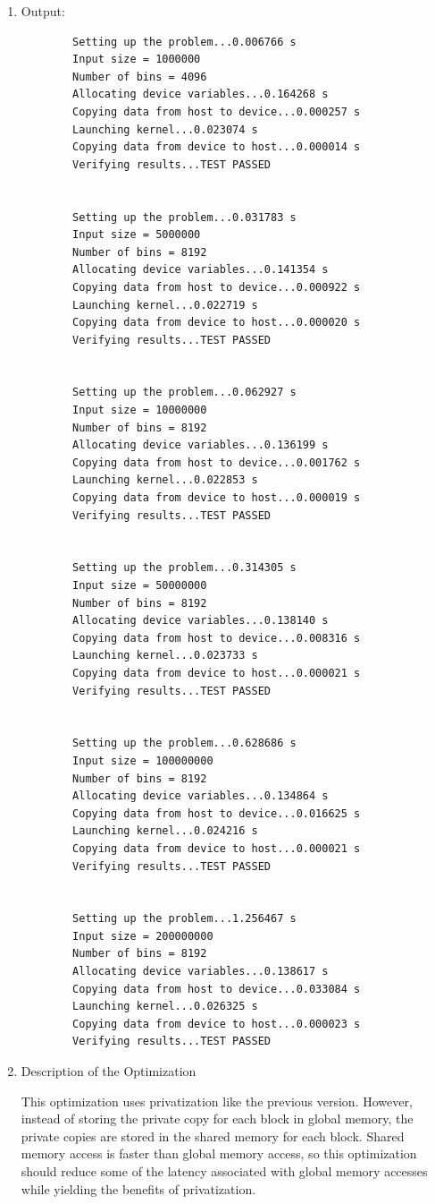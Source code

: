 \documentclass{article}
\begin{document}
\begin{enumerate}
	\item Output:
	\begin{verbatim}
		Setting up the problem...0.006766 s
		Input size = 1000000
		Number of bins = 4096
		Allocating device variables...0.164268 s
		Copying data from host to device...0.000257 s
		Launching kernel...0.023074 s
		Copying data from device to host...0.000014 s
		Verifying results...TEST PASSED
		
		
		Setting up the problem...0.031783 s
		Input size = 5000000
		Number of bins = 8192
		Allocating device variables...0.141354 s
		Copying data from host to device...0.000922 s
		Launching kernel...0.022719 s
		Copying data from device to host...0.000020 s
		Verifying results...TEST PASSED
		
		
		Setting up the problem...0.062927 s
		Input size = 10000000
		Number of bins = 8192
		Allocating device variables...0.136199 s
		Copying data from host to device...0.001762 s
		Launching kernel...0.022853 s
		Copying data from device to host...0.000019 s
		Verifying results...TEST PASSED
		
		
		Setting up the problem...0.314305 s
		Input size = 50000000
		Number of bins = 8192
		Allocating device variables...0.138140 s
		Copying data from host to device...0.008316 s
		Launching kernel...0.023733 s
		Copying data from device to host...0.000021 s
		Verifying results...TEST PASSED
		
		
		Setting up the problem...0.628686 s
		Input size = 100000000
		Number of bins = 8192
		Allocating device variables...0.134864 s
		Copying data from host to device...0.016625 s
		Launching kernel...0.024216 s
		Copying data from device to host...0.000021 s
		Verifying results...TEST PASSED
		
		
		Setting up the problem...1.256467 s
		Input size = 200000000
		Number of bins = 8192
		Allocating device variables...0.138617 s
		Copying data from host to device...0.033084 s
		Launching kernel...0.026325 s
		Copying data from device to host...0.000023 s
		Verifying results...TEST PASSED
	\end{verbatim}
	
	\item Description of the Optimization
	
	This optimization uses privatization like the previous version. However, instead of storing the private copy for each block in global memory, the private copies are stored in the shared memory for each block. Shared memory access is faster than global memory access, so this optimization should reduce some of the latency associated with global memory accesses while yielding the benefits of privatization.
	

\end{enumerate}
\end{document}
